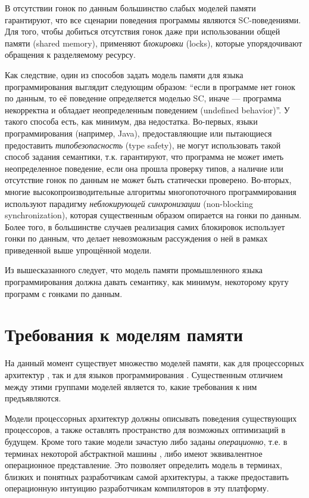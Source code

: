 В отсутствии гонок по данным большинство слабых моделей памяти гарантируют, что все сценарии поведения программы
являются SC-поведениями. Для того, чтобы добиться отсутствия гонок даже при использовании общей памяти (shared memory),
применяют \emph{блокировки} (locks), которые упорядочивают обращения к разделяемому ресурсу.

Как следствие, один из способов задать модель памяти для языка программирования выглядит следующим образом:
``если в программе нет гонок по данным, то её поведение определяется моделью SC, иначе --- программа некорректна и
обладает неопределенным поведением (undefined behavior)''.
У такого способа есть, как минимум, два недостатка.
Во-первых, языки программирования  (например, Java), предоставляющие или пытающиеся предоставить
\emph{типобезопасность} (type safety), не могут использовать такой способ задания семантики,
т.к. гарантируют, что программа не может иметь неопределенное поведение, если она прошла проверку типов, а
наличие или отсутствие гонок по данным не может быть статически проверено. 
Во-вторых, многие высокопроизводительные алгоритмы многопоточного программирования используют парадигму
\emph{неблокирующей синхронизации} (non-blocking synchronization), которая существенным образом опирается
на гонки по данным. Более того, в большинстве случаев реализация самих блокировок использует гонки по данным,
что делает невозможным рассуждения о ней в рамках приведенной выше упрощённой модели.

Из вышесказанного следует, что модель памяти промышленного языка программирования должна давать семантику,
как минимум, некоторому кругу программ с гонками по данным.

\section{Требования к моделям памяти}
На данный момент существует множество моделей памяти, как для процессорных архитектур
\cite{Sewell-al:CACM10,Alglave-al:TOPLAS14,Flur-al:POPL16,Pulte-al:POPL18,Sarkar-al:PLDI11,Kavanagh-Brookes:CoRR17},
так и для языков программирования
\cite{Crary-Sullivan:POPL15,Lamport:TC79,Boudol-al:EXPRESS12,Boudol-Petri:POPL09,PichonPharabod-Sewell:POPL16,Jeffrey-Riely:LICS16,
Nienhuis-al:OOPSLA16,Batty-al:POPL11,Manson-al:POPL05}.
Существенным отличием между этими группами моделей является то, какие требования к ним предъявляются.

Модели процессорных архитектур должны описывать поведения существующих процессоров, а также оставлять пространство
для возможных оптимизаций в будущем.
Кроме того такие модели зачастую либо заданы \emph{операционно}, т.е. в терминах некоторой
абстрактной машины \cite{Diehl-al:FGCS00}, либо имеют эквивалентное операционное представление.
Это позволяет определить модель в терминах, близких и понятных разработчикам самой архитектуры, а также предоставить
операционную интуицию разработчикам компиляторов в эту платформу.

